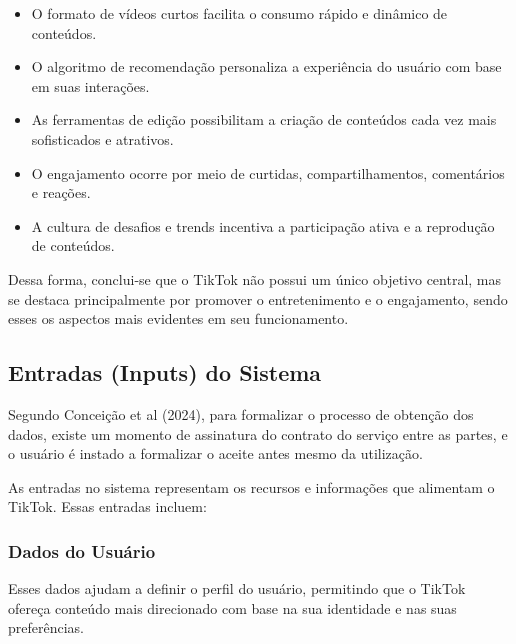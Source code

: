 \begin{itemize}
    \item O formato de vídeos curtos facilita o consumo rápido e dinâmico de conteúdos.
    \item O algoritmo de recomendação personaliza a experiência do usuário com base em suas interações.
    \item As ferramentas de edição possibilitam a criação de conteúdos cada vez mais sofisticados e atrativos.
    \item O engajamento ocorre por meio de curtidas, compartilhamentos, comentários e reações.
     \item A cultura de desafios e trends incentiva a participação ativa e a reprodução de conteúdos.
\end{itemize}


Dessa forma, conclui-se que o TikTok não possui um único objetivo central, mas se destaca principalmente por promover o entretenimento e o engajamento, sendo esses os aspectos mais evidentes em seu funcionamento.


\subsection{Entradas (Inputs) do Sistema}

Segundo Conceição et al (2024), para formalizar o processo de obtenção dos dados, existe um momento de assinatura do contrato do serviço entre as partes, e o usuário é instado a formalizar o aceite antes mesmo da utilização.\vskip0.3cm


As entradas no sistema representam os recursos e informações que alimentam o TikTok. Essas entradas incluem:


\subsubsection{Dados do Usuário}

Esses dados ajudam a definir o perfil do usuário, permitindo que o TikTok ofereça conteúdo mais direcionado com base na sua identidade e nas suas preferências. 

